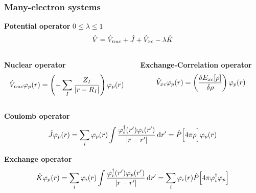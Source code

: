 \begin{frame}
  \frametitle{Many-electron systems}
  \centering
  \normalsize
  \textbf{Potential operator} $0 \leq \lambda \leq 1$
  \begin{equation}
    \nonumber
    \hat{V} = \hat{V}_{nuc} + \hat{J} + \hat{V}_{xc} - \lambda\hat{K}
  \end{equation}

  \vspace{8mm}

  \begin{columns}
    \begin{column}[b]{0.5\textwidth}
      \centering
      \textbf{Nuclear operator}
      \begin{equation}
        \nonumber
	    \hat{V}_{nuc} \varphi_p(r) = \left(-\sum_I\frac{Z_I}{|r-R_I|}\right) \varphi_p(r)
      \end{equation}
    \end{column}

    \begin{column}[b]{0.5\textwidth}
      \centering
      \textbf{Exchange-Correlation operator}
      \begin{equation}
        \nonumber
        \hat{V}_{xc} \varphi_p(r) = \left(\frac{\delta E_{xc}[\rho]}{\delta \rho}\right) \varphi_p(r)
      \end{equation}
    \end{column}
  \end{columns}

  \vspace{8mm}

  \centering
  \textbf{Coulomb operator}
  \begin{equation}
    \nonumber
    \hat{J}\varphi_p(r) = \sum_i \varphi_p(r) \int \frac{\varphi_i^\dagger(r')\varphi_i(r')}{|r-r'|} \,\mathrm{d} r'
                          = \hat{P}\Big[4\pi\rho\Big] \varphi_p(r)
  \end{equation}

  \vspace{5mm}

  \centering
  \textbf{Exchange operator}
  \begin{equation}
    \nonumber
    \hat{K}\varphi_p(r) = \sum_i \varphi_i(r) \int \frac{\varphi_i^\dagger(r')\varphi_p(r')}{|r-r'|} \,\mathrm{d} r'
                           = \sum_i \varphi_i(r) \hat{P}\Big[4\pi\varphi_i^\dagger \varphi_p\Big]
  \end{equation}
\end{frame}

